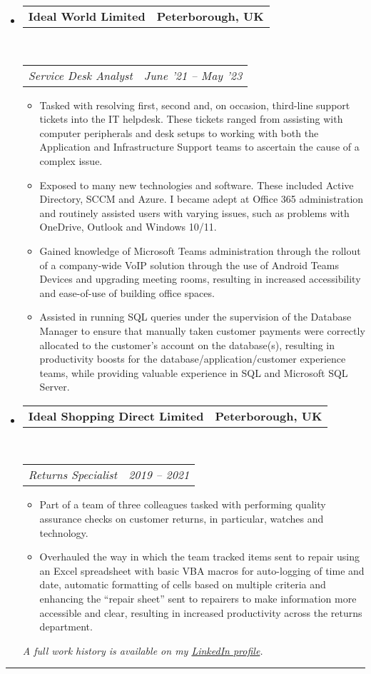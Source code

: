 \documentclass[10pt,a4paper]{article}
\makeatletter
\newcommand{\headerrow}[2]
{\begin{tabular*}{\linewidth}{l@{\extracolsep{\fill}}r}
	#1 &
	#2 \\
\end{tabular*}}
\makeatother
\begin{document}
\begin{itemize}
	\item
	\headerrow
		{\textbf{Ideal World Limited}}
		{\textbf{Peterborough, UK}}
	\\
	\headerrow
		{\emph{Service Desk Analyst}}
		{\emph{June '21 -- May '23}}
	\begin{itemize}
		\item Tasked with resolving first, second and, on occasion, third-line support tickets into the IT helpdesk. These tickets ranged from assisting with computer peripherals and desk setups to working with both the Application and Infrastructure Support teams to ascertain the cause of a complex issue.
		\item Exposed to many new technologies and software. These included Active Directory, SCCM and Azure. I became adept at Office 365 administration and routinely assisted users with varying issues, such as problems with OneDrive, Outlook and Windows 10/11.
		\item Gained knowledge of Microsoft Teams administration through the rollout of a company-wide VoIP solution through the use of Android Teams Devices and upgrading meeting rooms, resulting in increased accessibility and ease-of-use of building office spaces.
		\item Assisted in running SQL queries under the supervision of the Database Manager to ensure that manually taken customer payments were correctly allocated to the customer's account on the database(s), resulting in productivity boosts for the database/application/customer experience teams, while providing valuable experience in SQL and Microsoft SQL Server.
	\end{itemize}
\pagebreak
	\item
	\headerrow
		{\textbf{Ideal Shopping Direct Limited}}
		{\textbf{Peterborough, UK}}
	\\
	\headerrow
		{\emph{Returns Specialist}}
		{\emph{2019 -- 2021}}
	\begin{itemize}
		\item Part of a team of three colleagues tasked with performing quality assurance checks on customer returns, in particular, watches and technology. 
		\item Overhauled the way in which the team tracked items sent to repair using an Excel spreadsheet with basic VBA macros for auto-logging of time and date, automatic formatting of cells based on multiple criteria and enhancing the ``repair sheet'' sent to repairers to make information more accessible and clear, resulting in increased productivity across the returns department.
	\end{itemize}

	\begin{center}
		\color{gray}\small\emph{A full work history is available on my \href{https://linkedin.com/in/artydh}{LinkedIn profile}.}
	\end{center}
\end{itemize}
\vspace{-0.5em}
\hrule
\vspace{1.75em}
\end{document}
